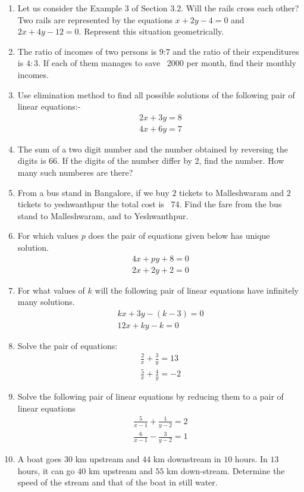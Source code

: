 \begin{enumerate}
\item Let us consider the Example $3$ of Section $3.2$. Will the rails cross each other? Two rails are represented by the equations $x+2y-4=0$ and $2x+4y-12=0$. Represent this situation geometrically.
\item The ratio of incomes of two persons is 9:7 and the ratio of their expenditures is $4:3$. If each of them manages to save \rupee~2000 per month, find their monthly incomes.
\item Use elimination method to find all possible solutions of the following pair of linear equations:-
\begin{align}
2x+3y = 8 \\ 4x+6y = 7
\end{align}
\item The sum of a two digit number and the number obtained by reversing the digits is $66$. If the digits of the number differ by 2, find the number. How many such numberes are there?
\item From a bus stand in Bangalore, if we buy $2$ tickets to Malleshwaram and $2$ tickets to yeshwanthpur the total cost is \rupee~74. Find the fare from the bus stand to Malleshwaram, and to Yeshwanthpur.
\item For which values $p$ does the pair of equations given below has unique solution.
\begin{align}
4x+py+8 = 0 \\ 2x+2y+2 = 0
\end{align}
\item For what values of $k$ will the following pair of linear equations have infinitely many solutions.
\begin{align}
kx+3y-(k-3) = 0 \\ 12x+ky-k = 0
\end{align}
\item Solve the pair of equations:
\begin{align}
\frac{2}{x}+\frac{3}{y}= 13 \\ \frac{5}{x}+\frac{4}{y} = -2
\end{align}
\item Solve the following pair of linear equations by reducing them to a pair of linear equations
\begin{align}
\frac{5}{x-1}+\frac{1}{y-2}= 2 \\ \frac{6}{x-1}-\frac{3}{y-2}= 1
\end{align}
\item A boat goes $30$ km upstream and $44$ km downstream in $10$ hours. In $13$ hours, it can go $40$ km upstream and $55$ km down-stream. Determine the speed of the stream and that of the boat in still water.
\end{enumerate}


  
 
